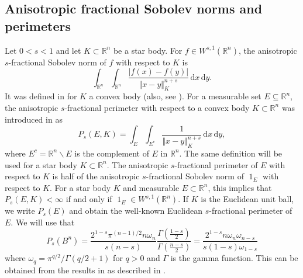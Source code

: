 \documentclass{amsart}
\newcommand{\Bvtex}{{B^n}}
\newcommand{\dvtex}{\,\mathrm{d}}
\renewcommand{\chi}{\operatorname{1}}
\begin{document}
\subsection{Anisotropic fractional Sobolev norms and perimeters}

Let $0<s<1$ and let $K\subset \mathbb R^{n}$ be a star body. For
$f \in W^{s,1}(\mathbb R^{n})$, the anisotropic $s$-fractional Sobolev
norm of $f$ with respect to $K$ is
%
\begin{equation*}
\int _{\mathbb R^{n}}\int _{\mathbb R^{n}}
\frac{\vert f(x)-f(y)\vert}{\Vert x-y\Vert _{K}^{n+s}} \dvtex x\dvtex y.
\end{equation*}
%
It was defined in \cite{Ludwig:fracperi} for $K$ a convex body (also, see
\cite{Ludwig:fracnorm}). For a measurable set
$E \subseteq \mathbb R^{n}$, the anisotropic $s$-fractional perimeter
with respect to a convex body $K\subset \mathbb R^{n}$ was introduced in
\cite{Ludwig:fracperi} as
%
\begin{equation*}
P_{s}(E,K)= \int _{E} \int _{E^{c}}
\frac{1}{\Vert x-y\Vert _{K}^{n+s}} \dvtex x \dvtex y,
\end{equation*}
%
where $E^{c}= \mathbb R^{n} \backslash E$ is the complement of $E$ in
$\mathbb R^{n}$. The same definition will be used for a star body
$K\subset \mathbb R^{n}$. The anisotropic $s$-fractional perimeter of
$E$ with respect to $K$ is half of the anisotropic $s$-fractional Sobolev
norm of $\chi _{E}$ with respect to $K$. For a star body $K$ and measurable
$E\subset \mathbb R^{n}$, this implies that $P_{s}(E,K)<\infty $ if and
only if $\chi _{E}\in W^{s,1}(\mathbb R^{n})$. If $K$ is the Euclidean
unit ball, we write $P_{s}(E)$ and obtain the well-known Euclidean
$s$-fractional perimeter of $E$. We will use that
%
\begin{equation}
\label{eq_psb}
P_{s}(\Bvtex )= \frac{2^{1-s} \pi ^{(n-1)/2}n\omega _{n}}{s(n-s)}
\frac{\Gamma \left (\frac{1-s}{2}\right )}{\Gamma \left (\frac{n-s}{2}\right )}
=\frac{2^{1-s} n\omega _{n}\omega _{n-s}}{s(1-s)\omega _{1-s}}
\end{equation}
%
where $\omega _{q}=\pi ^{q/2}/\Gamma (q/2+1)$ for $q>0$ and
$\Gamma $ is the gamma function. This can be obtained from the results
in \cite{FFMMM} as described in \cite{Garofalo20}.
\end{document}
